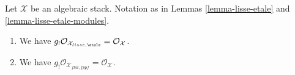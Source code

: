 %
\begin{lemma}
\label{lemma-lisse-etale-structure-sheaf}
Let $\mathcal{X}$ be an algebraic stack. Notation as in
Lemmas \ref{lemma-lisse-etale} and \ref{lemma-lisse-etale-modules}.
\begin{enumerate}
\item We have $g_!\mathcal{O}_{\mathcal{X}_{lisse,\etale}} =
\mathcal{O}_\mathcal{X}$.
\item We have $g_!\mathcal{O}_{\mathcal{X}_{flat, fppf}} =
\mathcal{O}_\mathcal{X}$.
\end{enumerate}
\end{lemma}


